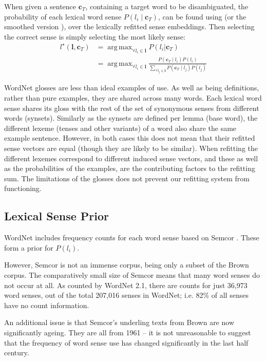 \documentclass{sig-alternate}
\renewcommand{\c}{\mathbf{c}}
\renewcommand{\l}{\mathbf{l}}
\DeclareMathOperator*{\argmax}{arg\,max}
\begin{document}
When given a sentence $\c_{T}$, containing a target word to be disambiguated, 
the probability of each lexical word sense $P(l_i \mid \c_{T})$, can be found using  (or the smoothed version ), over the lexically refitted sense embeddings. Then selecting the correct sense is simply selecting the most likely sense:
\begin{equation}
\begin{aligned}\label{eq:lexicalwsd}
l^\star (\l, \c_T) &= \argmax_{\forall l_i \in \l} P(l_i|\c_T) \\
&= \argmax_{\forall l_i \in \l} \frac{P(\c_T \mid l_i)P(l_i)}{\sum_{\forall l_j \in \l} P(\c_T \mid l_j)P(l_j)}
\end{aligned}
\end{equation}

WordNet glosses are less than ideal examples of use. As well as being definitions, rather than pure examples, they are shared across many words. Each lexical word sense shares its gloss with the rest of the set of synonymous senses from different words (synsets). Similarly as the synsets are defined per lemma (base word), the different lexeme (tenses and other variants) of a word also share the same example sentence. However, in both cases this does not mean that their refitted sense vectors are equal (though they are likely to be similar). When refitting the different lexemes correspond to different induced sense vectors, and these as well as the probabilities of the examples, are the contributing factors to the refitting sum. The limitations of the glosses does not prevent our refitting system from functioning.

\subsection{Lexical Sense Prior}
WordNet includes frequency counts for each word sense based on Semcor \textcite{tengi1998design}. These form a prior for $P(l_i)$.

However, Semcor is not an immense corpus, being only a subset of the Brown corpus. The comparatively small size of Semcor means that many word senses do not occur at all. As counted by WordNet 2.1, there are counts for just  36,973 word senses, out of the total 207,016 senses in WordNet; i.e. 82\% of all senses have no count information.

An additional issue is that Semcor's underling texts from Brown are now significantly ageing. They are all from 1961 \cite{francis1979brown} -- it is not unreasonable to suggest that the frequency of word sense use has changed significantly in the last half century.
\end{document}

